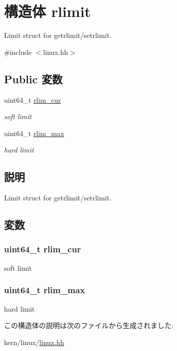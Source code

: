 \hypertarget{structLinux_1_1rlimit}{
\section{構造体 rlimit}
\label{structLinux_1_1rlimit}
}


Limit struct for getrlimit/setrlimit.  


{\ttfamily \#include $<$linux.hh$>$}\subsection*{Public 変数}
\begin{DoxyCompactItemize}
\item 
uint64\_\-t \hyperlink{structLinux_1_1rlimit_af39897d07737cb27ef9484ae73c05fa4}{rlim\_\-cur}
\begin{DoxyCompactList}\small\item\em soft limit \item\end{DoxyCompactList}\item 
uint64\_\-t \hyperlink{structLinux_1_1rlimit_af8e4fdfd658610e9b762fb606dce339a}{rlim\_\-max}
\begin{DoxyCompactList}\small\item\em hard limit \item\end{DoxyCompactList}\end{DoxyCompactItemize}


\subsection{説明}
Limit struct for getrlimit/setrlimit. 

\subsection{変数}
\hypertarget{structLinux_1_1rlimit_af39897d07737cb27ef9484ae73c05fa4}{
\subsubsection[{rlim\_\-cur}]{\setlength{\rightskip}{0pt plus 5cm}uint64\_\-t {\bf rlim\_\-cur}}}
\label{structLinux_1_1rlimit_af39897d07737cb27ef9484ae73c05fa4}


soft limit \hypertarget{structLinux_1_1rlimit_af8e4fdfd658610e9b762fb606dce339a}{
\subsubsection[{rlim\_\-max}]{\setlength{\rightskip}{0pt plus 5cm}uint64\_\-t {\bf rlim\_\-max}}}
\label{structLinux_1_1rlimit_af8e4fdfd658610e9b762fb606dce339a}


hard limit 

この構造体の説明は次のファイルから生成されました:\begin{DoxyCompactItemize}
\item 
kern/linux/\hyperlink{kern_2linux_2linux_8hh}{linux.hh}\end{DoxyCompactItemize}
